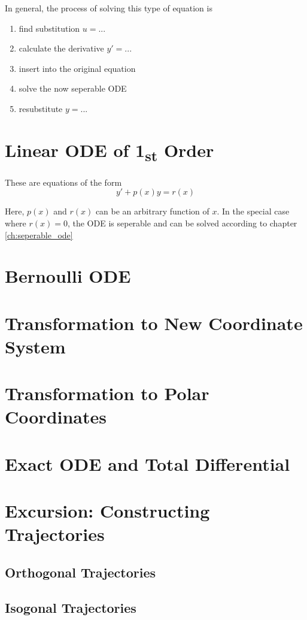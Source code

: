 \documentclass[./\jobname.tex]{subfiles}
\begin{document}
In general, the process of solving this type of equation is
\begin{enumerate}
	\item find substitution $u = ...$
	\item calculate the derivative $y' = ...$
	\item insert into the original equation
	\item solve the now seperable ODE
	\item resubstitute $y = ...$
\end{enumerate}

\section{Linear ODE of 1\textsubscript{st} Order}
These are equations of the form 
\begin{equation}
	y' + p(x)y = r(x)
\end{equation}

Here, $p(x)$ and $r(x)$ can be an arbitrary function of $x$. In the special case where $r(x) = 0$, the ODE is seperable and can be solved according to chapter \ref{ch:seperable_ode}

\section{Bernoulli ODE}

\section{Transformation to New Coordinate System}

\section{Transformation to Polar Coordinates}

\section{Exact ODE and Total Differential}

\section{Excursion: Constructing Trajectories}

\subsection{Orthogonal Trajectories}

\subsection{Isogonal Trajectories}
\end{document}
